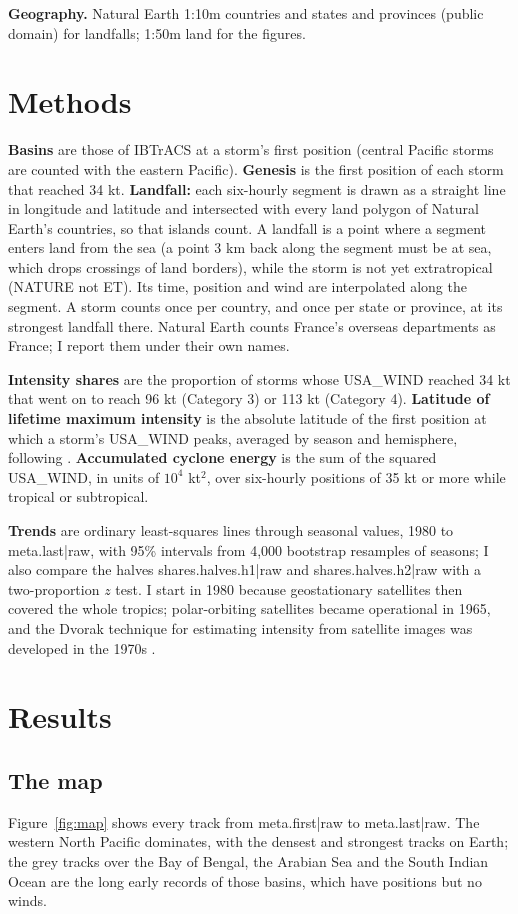 \documentclass[11pt,a4paper]{article}
\begin{document}
\textbf{Geography.} Natural Earth 1:10m countries and states and provinces (public domain) for landfalls; 1:50m land for the figures.

\section{Methods}
\textbf{Basins} are those of IBTrACS at a storm's first position (central Pacific storms are counted with the eastern Pacific). \textbf{Genesis} is the first position of each storm that reached 34 kt. \textbf{Landfall:} each six-hourly segment is drawn as a straight line in longitude and latitude and intersected with every land polygon of Natural Earth's countries, so that islands count. A landfall is a point where a segment enters land from the sea (a point 3 km back along the segment must be at sea, which drops crossings of land borders), while the storm is not yet extratropical (NATURE not ET). Its time, position and wind are interpolated along the segment. A storm counts once per country, and once per state or province, at its strongest landfall there. Natural Earth counts France's overseas departments as France; I report them under their own names.

\textbf{Intensity shares} are the proportion of storms whose USA\_WIND reached 34 kt that went on to reach 96 kt (Category 3) or 113 kt (Category 4). \textbf{Latitude of lifetime maximum intensity} is the absolute latitude of the first position at which a storm's USA\_WIND peaks, averaged by season and hemisphere, following \citet{kossin2014}. \textbf{Accumulated cyclone energy} is the sum of the squared USA\_WIND, in units of $10^4$ kt$^2$, over six-hourly positions of 35 kt or more while tropical or subtropical.

\textbf{Trends} are ordinary least-squares lines through seasonal values, 1980 to {{meta.last|raw}}, with 95\% intervals from 4,000 bootstrap resamples of seasons; I also compare the halves {{shares.halves.h1|raw}} and {{shares.halves.h2|raw}} with a two-proportion $z$ test. I start in 1980 because geostationary satellites then covered the whole tropics; polar-orbiting satellites became operational in 1965, and the Dvorak technique for estimating intensity from satellite images was developed in the 1970s \citep{wikitc}.

\section{Results}
\subsection{The map}
Figure~\ref{fig:map} shows every track from {{meta.first|raw}} to {{meta.last|raw}}. The western North Pacific dominates, with the densest and strongest tracks on Earth; the grey tracks over the Bay of Bengal, the Arabian Sea and the South Indian Ocean are the long early records of those basins, which have positions but no winds.
\end{document}
